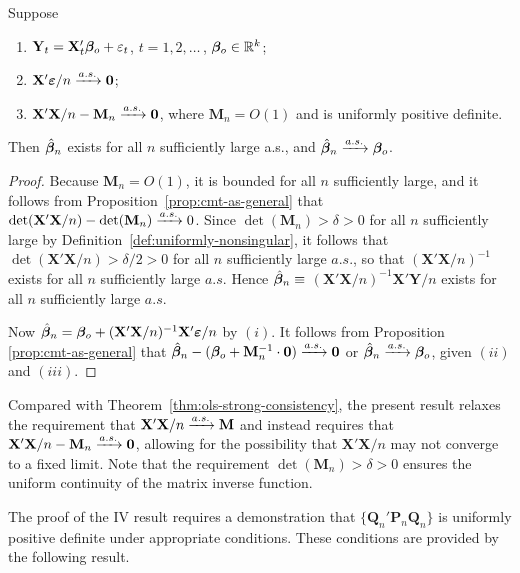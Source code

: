 \begin{theorem}\label{thm:ols-strong-general}
Suppose
\begin{enumerate}[label=$(\roman*)$]
\item $\mathbf{Y}_t = \mathbf{X}_t'\boldsymbol{\beta}_o + \varepsilon_t$, \quad $t = 1, 2, \ldots$\,, $\boldsymbol{\beta}_o \in \mathbb{R}^k$;
\item $\mathbf{X}'\boldsymbol{\varepsilon}/n \xrightarrow{a.s.} \mathbf{0}$;
\item $\mathbf{X}'\mathbf{X}/n - \mathbf{M}_n \xrightarrow{a.s.} \mathbf{0}$, where $\mathbf{M}_n = O(1)$ and is uniformly positive
definite.
\end{enumerate}
Then $\hat{\boldsymbol{\beta}}_n$ exists for all $n$ sufficiently large a.s., and $\hat{\boldsymbol{\beta}}_n \xrightarrow{a.s.} \boldsymbol{\beta}_o$.
\end{theorem}

\begin{proof}
Because $\mathbf{M}_n = O(1)$, it is bounded for all $n$ sufficiently large,
and it follows from Proposition~\ref{prop:cmt-as-general} that $\det(\mathbf{X}'\mathbf{X}/n) - \det(\mathbf{M}_n) \xrightarrow{a.s.} 0$.
Since $\det(\mathbf{M}_n) > \delta > 0$ for all $n$ sufficiently large by Definition~\ref{def:uniformly-nonsingular},
it follows that $\det(\mathbf{X}'\mathbf{X}/n) > \delta/2 > 0$ for all $n$ sufficiently large $a.s.$,
so that $(\mathbf{X}'\mathbf{X}/n)^{-1}$ exists for all $n$ sufficiently large $a.s.$ Hence $\hat{\boldsymbol{\beta}}_n \equiv$
$(\mathbf{X}'\mathbf{X}/n)^{-1}\mathbf{X}'\mathbf{Y}/n$ exists for all $n$ sufficiently large $a.s.$

Now $\hat{\boldsymbol{\beta}}_n = \boldsymbol{\beta}_o + (\mathbf{X}'\mathbf{X}/n)^{-1}\mathbf{X}'\boldsymbol{\varepsilon}/n$ by $(i)$. It follows from Proposition
\ref{prop:cmt-as-general} that $\hat{\boldsymbol{\beta}}_n - (\boldsymbol{\beta}_o + \mathbf{M}_n^{-1} \cdot \mathbf{0}) \xrightarrow{a.s.} \mathbf{0}$ or $\hat{\boldsymbol{\beta}}_n \xrightarrow{a.s.} \boldsymbol{\beta}_o$, given $(ii)$ and $(iii)$.
\end{proof}

Compared with Theorem~\ref{thm:ols-strong-consistency}, the present result relaxes the requirement
that $\mathbf{X}'\mathbf{X}/n \xrightarrow{a.s.} \mathbf{M}$ and instead requires that $\mathbf{X}'\mathbf{X}/n - \mathbf{M}_n \xrightarrow{a.s.} \mathbf{0}$, allowing
for the possibility that $\mathbf{X}'\mathbf{X}/n$ may not converge to a fixed limit. Note that
the requirement $\det(\mathbf{M}_n) > \delta > 0$ ensures the uniform continuity of the
matrix inverse function.

The proof of the IV result requires a demonstration that $\{\mathbf{Q}_n'\mathbf{P}_n\mathbf{Q}_n\}$ is
uniformly positive definite under appropriate conditions. These conditions
are provided by the following result.

